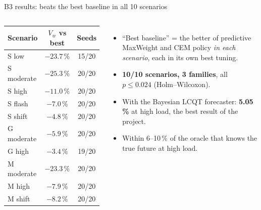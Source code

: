 \documentclass[aspectratio=169,11pt]{beamer}
\begin{document}
\begin{frame}{B3 results: beats the best baseline in all 10 scenarios}
\begin{columns}[c]
\footnotesize
\begin{tabular}{lcc}
\toprule
Scenario & $V_w$ vs best & Seeds \\
\midrule
S low & $\mathbf{-23.7\,\%}$ & 15/20 \\
S moderate & $\mathbf{-25.3\,\%}$ & 20/20 \\
S high & $\mathbf{-11.0\,\%}$ & 20/20 \\
S flash & $\mathbf{-7.0\,\%}$ & 20/20 \\
S shift & $\mathbf{-4.8\,\%}$ & 20/20 \\
G moderate & $\mathbf{-5.9\,\%}$ & 20/20 \\
G high & $\mathbf{-3.4\,\%}$ & 19/20 \\
M moderate & $\mathbf{-23.3\,\%}$ & 20/20 \\
M high & $\mathbf{-7.9\,\%}$ & 20/20 \\
M shift & $\mathbf{-8.2\,\%}$ & 20/20 \\
\bottomrule
\end{tabular}
\small
\begin{itemize}
  \item ``Best baseline'' = the better of predictive MaxWeight and CEM policy \emph{in each scenario}, each in its own best tuning.
  \item \textbf{10/10 scenarios, 3 families}, all $p \le 0.024$ (Holm--Wilcoxon).
  \item With the Bayesian LCQT forecaster: \textbf{5.05\,\%} at high load, the best result of the project.
  \item Within 6--10\,\% of the oracle that knows the true future at high load.
\end{itemize}
\end{columns}
\end{frame}

\end{document}
